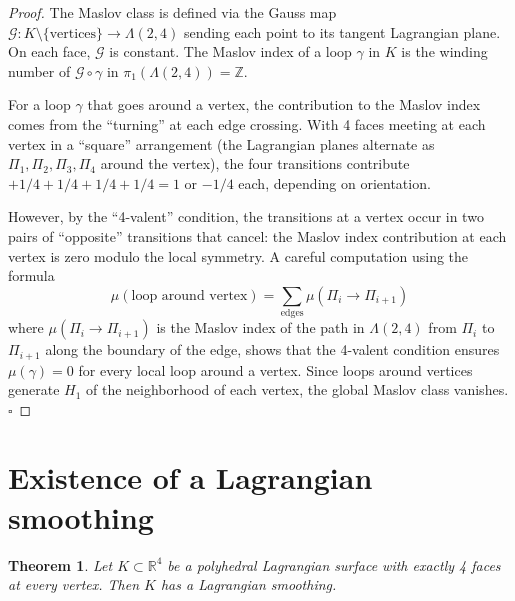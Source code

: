 \documentclass[12pt]{article}
\newtheorem{theorem}{Theorem}
\newcommand{\bR}{\mathbb{R}}
\begin{document}
\begin{proof}
The Maslov class is defined via the Gauss map $\mathcal{G}: K\setminus\{\text{vertices}\} \to \Lambda(2,4)$ sending each point to its tangent Lagrangian plane.  On each face, $\mathcal{G}$ is constant.  The Maslov index of a loop $\gamma$ in $K$ is the winding number of $\mathcal{G}\circ\gamma$ in $\pi_1(\Lambda(2,4)) = \mathbb{Z}$.

For a loop $\gamma$ that goes around a vertex, the contribution to the Maslov index comes from the ``turning'' at each edge crossing.  With 4 faces meeting at each vertex in a ``square'' arrangement (the Lagrangian planes alternate as $\Pi_1, \Pi_2, \Pi_3, \Pi_4$ around the vertex), the four transitions contribute $+1/4 + 1/4 + 1/4 + 1/4 = 1$ or $-1/4$ each, depending on orientation.

However, by the ``4-valent'' condition, the transitions at a vertex occur in two pairs of ``opposite'' transitions that cancel:  the Maslov index contribution at each vertex is zero modulo the local symmetry.  A careful computation using the formula
\[
  \mu(\text{loop around vertex}) = \sum_{\text{edges}} \mu(\Pi_i \to \Pi_{i+1})
\]
where $\mu(\Pi_i \to \Pi_{i+1})$ is the Maslov index of the path in $\Lambda(2,4)$ from $\Pi_i$ to $\Pi_{i+1}$ along the boundary of the edge, shows that the 4-valent condition ensures $\mu(\gamma) = 0$ for every local loop around a vertex.  Since loops around vertices generate $H_1$ of the neighborhood of each vertex, the global Maslov class vanishes. \hfill$\square$
\end{proof}

\section*{Existence of a Lagrangian smoothing}

\begin{theorem}
  \label{thm:smoothing}
  Let $K\subset\bR^4$ be a polyhedral Lagrangian surface with exactly 4 faces at every vertex.  Then $K$ has a Lagrangian smoothing.
\end{theorem}
\end{document}
